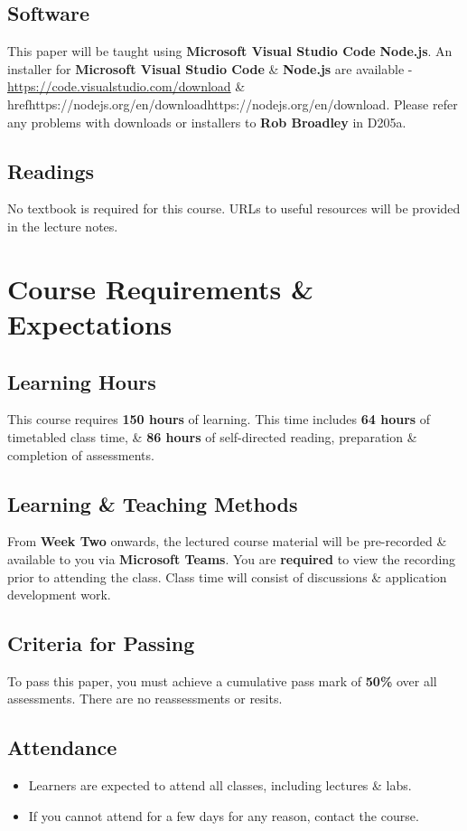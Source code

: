 \documentclass{article}
\begin{document}
\subsection*{Software}
This paper will be taught using \textbf{Microsoft Visual Studio Code} \* \textbf{Node.js}. An installer for \textbf{Microsoft Visual Studio Code} \& \textbf{Node.js} are available - \href{https://code.visualstudio.com/download}{https://code.visualstudio.com/download} \& href{https://nodejs.org/en/download}{https://nodejs.org/en/download}. Please refer any problems with downloads or installers to \textbf{Rob Broadley} in D205a.

\subsection*{Readings}
No textbook is required for this course. URLs to useful resources will be provided in the lecture notes.

\section*{Course Requirements \& Expectations}

\subsection*{Learning Hours}
This course requires \textbf{150 hours} of learning. This time includes \textbf{64 hours} of timetabled class time, \& \textbf{86 hours} of self-directed reading, preparation \& completion of assessments.

\subsection*{Learning \& Teaching Methods}
From \textbf{Week Two} onwards, the lectured course material will be pre-recorded \& available to you via \textbf{Microsoft Teams}. You are \textbf{required} to view the recording prior to attending the class. Class time will consist of discussions \& application development work.  

\subsection*{Criteria for Passing}
To pass this paper, you must achieve a cumulative pass mark of \textbf{50\%} over all assessments. There are no reassessments or resits.

\subsection*{Attendance}
\begin{itemize}
	\item Learners are expected to attend all classes, including lectures \& labs.
	\item If you cannot attend for a few days for any reason, contact the course.
\end{itemize}
\end{document}
